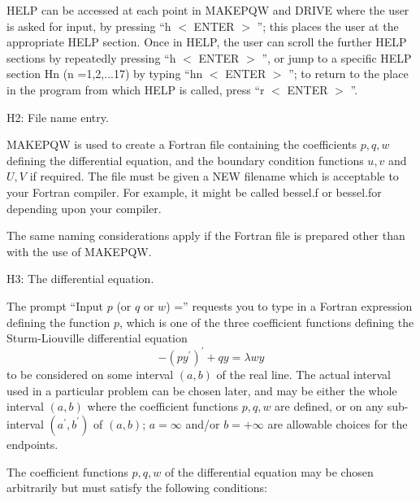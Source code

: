\documentclass[12pt]{amsart}%
\theoremstyle{plain}
\numberwithin{equation}{section}
\numberwithin{theorem}{section}
\begin{document}
HELP can be accessed at each point in MAKEPQW and DRIVE where the user is
asked for input, by pressing ``h
$<$%
ENTER%
$>$%
''; this places the user at the appropriate HELP section. Once in HELP, the
user can scroll the further HELP sections by repeatedly pressing ``h
$<$%
ENTER%
$>$%
'', or jump to a specific HELP section Hn (n =1,2,...17) by typing ``hn
$<$%
ENTER%
$>$%
''; to return to the place in the program from which HELP is called, press
``r
$<$%
ENTER%
$>$%
''.

\medskip

H2: File name entry.

MAKEPQW is used to create a Fortran file containing the coefficients $p,q,w$
defining the differential equation, and the boundary condition functions $u,v$
and $U,V$ if required. The file must be given a NEW filename which is
acceptable to your Fortran compiler. For example, it might be called bessel.f
or bessel.for depending upon your compiler.

The same naming considerations apply if the Fortran file is prepared other
than with the use of MAKEPQW.

\medskip

H3: The differential equation.

The prompt ``Input $p$ (or $q$ or $w$) ='' requests you to type in a Fortran
expression defining the function $p$, which is one of the three coefficient
functions defining the Sturm-Liouville differential equation%
\begin{equation}
-(py^{\prime})^{\prime}+qy=\lambda wy \tag{*}%
\end{equation}
to be considered on some interval $(a,b)$ of the real line. The actual
interval used in a particular problem can be chosen later, and may be either
the whole interval $(a,b)$ where the coefficient functions $p,q,w$ are
defined, or on any sub-interval $(a^{\prime},b^{\prime})$ of $(a,b)$;
$a=\infty$ and/or $b=+\infty$ are allowable choices for the endpoints.

The coefficient functions $p,q,w$ of the differential equation may be chosen
arbitrarily but must satisfy the following conditions:
\end{document}
